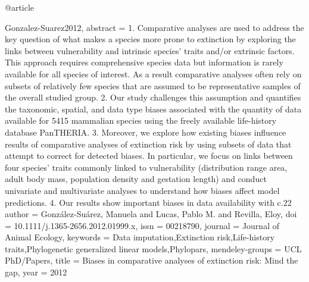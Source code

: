 {{{{{@article{Gonzalez-Suarez2012,
abstract = {1. Comparative analyses are used to address the key question of what makes a species more prone to extinction by exploring the links between vulnerability and intrinsic species' traits and/or extrinsic factors. This approach requires comprehensive species data but information is rarely available for all species of interest. As a result comparative analyses often rely on subsets of relatively few species that are assumed to be representative samples of the overall studied group. 2. Our study challenges this assumption and quantifies the taxonomic, spatial, and data type biases associated with the quantity of data available for 5415 mammalian species using the freely available life-history database PanTHERIA. 3. Moreover, we explore how existing biases influence results of comparative analyses of extinction risk by using subsets of data that attempt to correct for detected biases. In particular, we focus on links between four species' traits commonly linked to vulnerability (distribution range area, adult body mass, population density and gestation length) and conduct univariate and multivariate analyses to understand how biases affect model predictions. 4. Our results show important biases in data availability with c.22%
author = {Gonz{\'{a}}lez-Su{\'{a}}rez, Manuela and Lucas, Pablo M. and Revilla, Eloy},
doi = {10.1111/j.1365-2656.2012.01999.x},
issn = {00218790},
journal = {Journal of Animal Ecology},
keywords = {Data imputation,Extinction risk,Life-history traits,Phylogenetic generalized linear models,Phylopars},
mendeley-groups = {UCL PhD/Papers},
title = {{Biases in comparative analyses of extinction risk: Mind the gap}},
year = {2012}
}

}}}}}}
